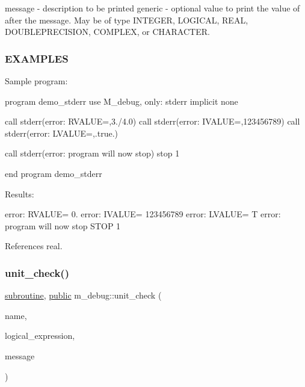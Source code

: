 message -\/ description to be printed generic -\/ optional value to print the value of after the message. May be of type I\+N\+T\+E\+G\+ER, L\+O\+G\+I\+C\+AL, R\+E\+AL, D\+O\+U\+B\+L\+E\+P\+R\+E\+C\+I\+S\+I\+ON, C\+O\+M\+P\+L\+EX, or C\+H\+A\+R\+A\+C\+T\+ER. \subsubsection*{E\+X\+A\+M\+P\+L\+ES}

Sample program\+:

program demo\+\_\+stderr use M\+\_\+debug, only\+: stderr implicit none

call stderr(\textquotesingle{}error\+: R\+V\+A\+L\+UE=\textquotesingle{},3./4.0) call stderr(\textquotesingle{}error\+: I\+V\+A\+L\+UE=\textquotesingle{},123456789) call stderr(\textquotesingle{}error\+: L\+V\+A\+L\+UE=\textquotesingle{},.true.)

call stderr(\textquotesingle{}error\+: program will now stop\textquotesingle{}) stop 1

end program demo\+\_\+stderr

Results\+:

error\+: R\+V\+A\+L\+UE= 0. error\+: I\+V\+A\+L\+UE= 123456789 error\+: L\+V\+A\+L\+UE= T error\+: program will now stop S\+T\+OP 1 

References real.

\mbox{\label{namespacem__debug_a0ae797092ab85a8ba9258dc9f8949189}} 
\subsubsection{\texorpdfstring{unit\+\_\+check()}{unit\_check()}}
{\footnotesize\ttfamily \hyperlink{M__stopwatch_83_8txt_acfbcff50169d691ff02d4a123ed70482}{subroutine}, \hyperlink{M__stopwatch_83_8txt_a2f74811300c361e53b430611a7d1769f}{public} m\+\_\+debug\+::unit\+\_\+check (\begin{DoxyParamCaption}\item[{\hyperlink{option__stopwatch_83_8txt_abd4b21fbbd175834027b5224bfe97e66}{character}(len=$\ast$), intent(\hyperlink{M__journal_83_8txt_afce72651d1eed785a2132bee863b2f38}{in})}]{name,  }\item[{logical, intent(\hyperlink{M__journal_83_8txt_afce72651d1eed785a2132bee863b2f38}{in})}]{logical\+\_\+expression,  }\item[{\hyperlink{option__stopwatch_83_8txt_abd4b21fbbd175834027b5224bfe97e66}{character}(len=$\ast$), intent(\hyperlink{M__journal_83_8txt_afce72651d1eed785a2132bee863b2f38}{in}), \hyperlink{option__stopwatch_83_8txt_aa4ece75e7acf58a4843f70fe18c3ade5}{optional}}]{message }\end{DoxyParamCaption})}




